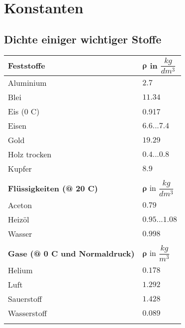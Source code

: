 
\newpage
\section{Konstanten}
	\subsection{Dichte einiger wichtiger Stoffe}
		\begin{tabular}{| p{6cm} | p{5cm} |}
			\hline
			\textbf{Feststoffe}	&	$\boldsymbol{\rho}$ in $\dfrac{kg}{dm^3}$\\
			\hline
			Aluminium & $2.7$\\
			Blei & $11.34$\\
			Eis (0 \textdegree C) & 0.917\\
			Eisen & $6.6...7.4$\\
			Gold & $19.29$\\
			Holz trocken & $0.4...0.8$\\
			Kupfer & $8.9$\\
			& \\
			\hline
			\textbf{Flüssigkeiten (@ 20 \textdegree C)} & $\boldsymbol{\rho}$ in $\dfrac{kg}{dm^3}$\\
			\hline
			Aceton & $0.79$\\
			Heizöl & $0.95...1.08$\\
			Wasser & $0.998$\\
			& \\
			\hline
			\textbf{Gase (@ 0 \textdegree C und Normaldruck)}	&	$\boldsymbol{\rho}$ in $\dfrac{kg}{m^3}$\\
			\hline
			Helium & $0.178$\\
			Luft & $1.292$\\
			Sauerstoff & $1.428$\\
			Wasserstoff & $0.089$\\
			& \\
			\hline
		\end{tabular}
	
